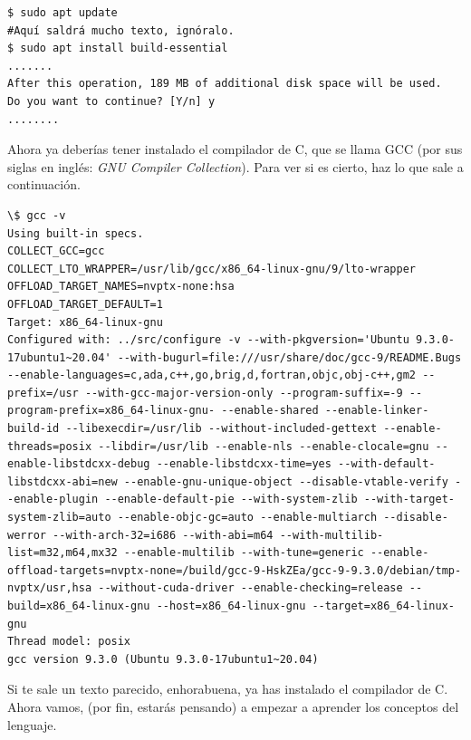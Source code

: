 \documentclass[a4paper]{article}
\begin{document}
\noindent
\begin{minipage}[H]{\linewidth}
\mbox{}
\begin{lstlisting}[style=terminalStyle]
$ sudo apt update
#Aquí saldrá mucho texto, ignóralo.
$ sudo apt install build-essential
.......
After this operation, 189 MB of additional disk space will be used.
Do you want to continue? [Y/n] y
........
\end{lstlisting}
\end{minipage}



Ahora ya deberías tener instalado el compilador de C, que se llama GCC (por
sus siglas en inglés: \textit{GNU Compiler Collection}).
Para ver si es cierto, haz lo que sale a continuación.


\noindent
\begin{minipage}[H]{\linewidth}
\mbox{}
\begin{lstlisting}[style=terminalStyle]
\$ gcc -v
Using built-in specs.
COLLECT_GCC=gcc
COLLECT_LTO_WRAPPER=/usr/lib/gcc/x86_64-linux-gnu/9/lto-wrapper
OFFLOAD_TARGET_NAMES=nvptx-none:hsa
OFFLOAD_TARGET_DEFAULT=1
Target: x86_64-linux-gnu
Configured with: ../src/configure -v --with-pkgversion='Ubuntu 9.3.0-17ubuntu1~20.04' --with-bugurl=file:///usr/share/doc/gcc-9/README.Bugs --enable-languages=c,ada,c++,go,brig,d,fortran,objc,obj-c++,gm2 --prefix=/usr --with-gcc-major-version-only --program-suffix=-9 --program-prefix=x86_64-linux-gnu- --enable-shared --enable-linker-build-id --libexecdir=/usr/lib --without-included-gettext --enable-threads=posix --libdir=/usr/lib --enable-nls --enable-clocale=gnu --enable-libstdcxx-debug --enable-libstdcxx-time=yes --with-default-libstdcxx-abi=new --enable-gnu-unique-object --disable-vtable-verify --enable-plugin --enable-default-pie --with-system-zlib --with-target-system-zlib=auto --enable-objc-gc=auto --enable-multiarch --disable-werror --with-arch-32=i686 --with-abi=m64 --with-multilib-list=m32,m64,mx32 --enable-multilib --with-tune=generic --enable-offload-targets=nvptx-none=/build/gcc-9-HskZEa/gcc-9-9.3.0/debian/tmp-nvptx/usr,hsa --without-cuda-driver --enable-checking=release --build=x86_64-linux-gnu --host=x86_64-linux-gnu --target=x86_64-linux-gnu
Thread model: posix
gcc version 9.3.0 (Ubuntu 9.3.0-17ubuntu1~20.04)
\end{lstlisting}
\end{minipage}


Si te sale un texto parecido, enhorabuena, ya has instalado el compilador de C.
Ahora vamos, (por fin, estarás pensando) a empezar a aprender los conceptos del
lenguaje.
\end{document}
